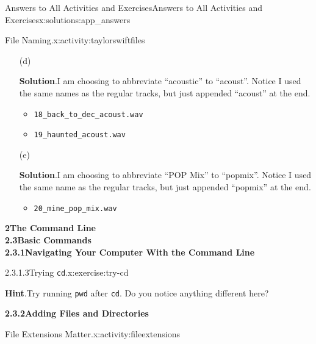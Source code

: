 \documentclass[oneside,10pt,]{book}
\newcommand{\blocktitlefont}{\relax}
\newcommand{\mono}[1]{\texttt{#1}}
\begin{document}
\begin{solutions-chapter}{Answers to All Activities and Exercises}{}{Answers to All Activities and Exercises}{}{}{x:solutions:app_answers}
\begin{activitysolution}{1.2}{File Naming.}{x:activity:taylorswiftfiles}
\begin{enumerate}[font=\bfseries,label=(\alph*),ref=\alph*]
\begin{multicols}{2}
\begin{itemize}[label=\textbullet]
\item{}\mono{17\_superman.wav}%
\end{itemize}
\end{multicols}
%
\item[(d)]\par\smallskip%
\noindent\textbf{\blocktitlefont Solution}.\hypertarget{g:solution:idp614932776-back}{}\quad{}I am choosing to abbreviate ``acoustic'' to ``acoust''. Notice I used the same names as the regular tracks, but just appended ``\textunderscore{}acoust'' at the end.%
\begin{itemize}[label=\textbullet]
\item{}\mono{18\_back\_to\_dec\_acoust.wav}%
\item{}\mono{19\_haunted\_acoust.wav}%
\end{itemize}
%
\item[(e)]\par\smallskip%
\noindent\textbf{\blocktitlefont Solution}.\hypertarget{g:solution:idp614937384-back}{}\quad{}I am choosing to abbreviate ``POP Mix'' to ``pop\textunderscore{}mix''. Notice I used the same name as the regular tracks, but just appended ``\textunderscore{}pop\textunderscore{}mix'' at the end.%
\begin{itemize}[label=\textbullet]
\item{}\mono{20\_mine\_pop\_mix.wav}%
\end{itemize}
%
\end{enumerate}
\end{activitysolution}%
\par\medskip
\noindent\textbf{\Large{}2\space\textperiodcentered\space{}The Command Line\\
2.3\space\textperiodcentered\space{}Basic Commands\\
2.3.1\space\textperiodcentered\space{}Navigating Your Computer With the Command Line}
\begin{inlinesolution}{2.3.1.3}{Trying \mono{cd}.}{x:exercise:try-cd}%
\par\smallskip%
\noindent\textbf{\blocktitlefont Hint}.\hypertarget{g:hint:idp615426968-back}{}\quad{}Try running \mono{pwd} after \mono{cd}. Do you notice anything different here?%
\end{inlinesolution}%
\par\medskip
\noindent\textbf{\Large{}2.3.2\space\textperiodcentered\space{}Adding Files and Directories}
\begin{activitysolution}{2.1}{File Extensions Matter.}{x:activity:fileextensions}%
\begin{enumerate}[font=\bfseries,label=(\alph*),ref=\alph*]

\end{enumerate}
\end{activitysolution}
\end{solutions-chapter}
\end{document}
